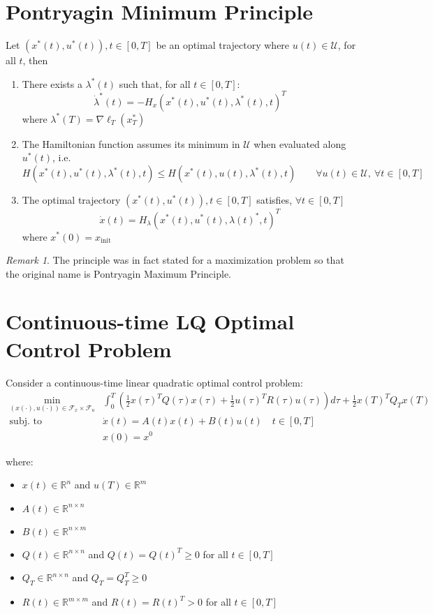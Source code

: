 \documentclass[openany]{book}
\theoremstyle{definition}
\theoremstyle{remark}
\newtheorem*{remark}{Remark}
\begin{document}
\section{Pontryagin Minimum Principle}
Let $(x^*(t),u^*(t)), t\in[0,T]$ be an optimal trajectory where $u(t)\in\mathcal{U}$, for all $t$, then 
\begin{enumerate}
    \item There exists a $\lambda^*(t)$ such that, for all $t\in[0,T]$:
        \[
            \dot{\lambda}^*(t) = -H_x(x^*(t),u^*(t),\lambda^*(t),t)^T
        \]
        where $\lambda^*(T)=\nabla\ell_T(x_T^*)$
    \item The Hamiltonian function assumes its minimum in $\mathcal{U}$ when evaluated along $u^*(t)$, i.e. 
        \[
            H(x^*(t),u^*(t),\lambda^*(t),t) \leq H(x^*(t),u(t),\lambda^*(t),t) \qquad \forall u(t)\in \mathcal{U},\ \forall t\in[0,T]
        \]
    \item The optimal trajectory $(x^*(t),u^*(t)), t\in[0,T]$ satisfies, $\forall t \in[0,T]$ 
        \[
            \dot{x}(t) = H_\lambda(x^*(t),u^*(t),\lambda(t)^*,t)^T
        \]
        where $x^*(0) = x_{\text{init}}$
\end{enumerate}
\begin{remark}
    The principle was in fact stated for a maximization problem so that the original name is
Pontryagin Maximum Principle.
\end{remark}


\section{Continuous-time LQ Optimal Control Problem}

Consider a continuous-time linear quadratic optimal control problem:
\begin{align*}
    \min_{(x(\cdot),u(\cdot))\in\mathcal{F}_x\times\mathcal{F}_u} &\int_0^T \left(\frac{1}{2}x(\tau)^TQ(\tau)x(\tau) + \frac{1}{2}u(\tau)^TR(\tau)u(\tau)\right)d\tau + \frac{1}{2}x(T)^TQ_Tx(T)\\
    \text{subj. to } & \dot{x}(t) = A(t)x(t) + B(t)u(t) \quad t \in [0,T]\\
    & x(0) = x^0
\end{align*}

where:
\begin{itemize}
    \item $x(t) \in \mathbb{R}^n$ and $u(T) \in \mathbb{R}^m$
    \item $A(t) \in \mathbb{R}^{n\times n}$
    \item $B(t) \in \mathbb{R}^{n\times m}$
    \item $Q(t) \in \mathbb{R}^{n\times n}$ and $Q(t) = Q(t)^T \geq 0$ for all $t \in [0,T]$
    \item $Q_T \in \mathbb{R}^{n\times n}$ and $Q_T = Q_T^T \geq 0$
    \item $R(t) \in \mathbb{R}^{m\times m}$ and $R(t) = R(t)^T > 0$ for all $t \in [0,T]$
\end{itemize}
\end{document}
